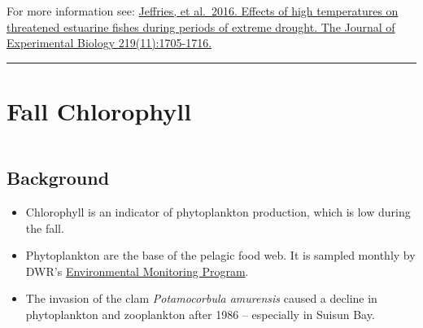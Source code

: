 \documentclass[
]{book}
\providecommand{\tightlist}{%
  \setlength{\itemsep}{0pt}\setlength{\parskip}{0pt}}
\begin{document}
\begin{disclaimer}
For more information see:
\href{https://jeb.biologists.org/content/219/11/1705.short}{Jeffries, et
al.~2016. Effects of high temperatures on threatened estuarine fishes
during periods of extreme drought. The Journal of Experimental Biology
219(11):1705-1716.}
\end{disclaimer}

\begin{center}\rule{0.5\linewidth}{0.5pt}\end{center}

\hypertarget{fall-chlorophyll}{%
\section{Fall Chlorophyll}\label{fall-chlorophyll}}

\begin{column}{0.7\textwidth}
\hypertarget{background-14}{%
\subsection{Background}\label{background-14}}

\begin{itemize}
\tightlist
\item
  Chlorophyll is an indicator of phytoplankton production, which is low during the fall.
\item
  Phytoplankton are the base of the pelagic food web. It is sampled monthly by DWR's \href{https://emp.baydeltalive.com/wiki/12297}{Environmental Monitoring Program}.
\item
  The invasion of the clam \emph{Potamocorbula amurensis} caused a decline in phytoplankton and zooplankton after 1986 -- especially in Suisun Bay.
\end{itemize}
\end{column}
\end{document}
